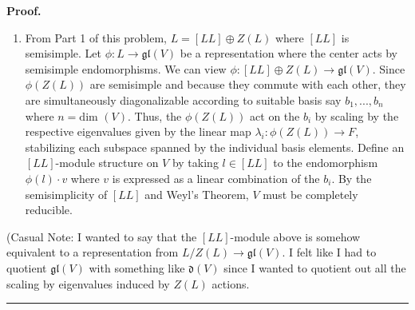 \documentclass[12pt]{article}%
\newenvironment{proof}[1][Proof]{\textbf{#1.} }{\ \rule{0.5em}{0.5em}}
\begin{document}
\begin{proof}
\begin{enumerate}
    \item From Part 1 of this problem, $L = [LL] \oplus Z(L)$ where $[LL]$ is semisimple. Let $\phi: L \rightarrow \mathfrak{gl}(V)$ be a representation where the center acts by semisimple endomorphisms. We can view $\phi: [LL] \oplus Z(L) \rightarrow \mathfrak{gl}(V)$. Since $\phi(Z(L))$ are semisimple and because they commute with each other, they are simultaneously diagonalizable according to suitable basis say $b_1,...,b_n$ where $n = \text{dim }(V)$. Thus, the $\phi(Z(L))$ act on the $b_i$ by scaling by the respective eigenvalues given by the linear map $\lambda_i:\phi(Z(L)) \rightarrow F$, stabilizing each subspace spanned by the individual basis elements. Define an $[LL]$-module structure on $V$ by taking $l \in [LL]$ to the endomorphism $\phi(l)\cdot v$ where $v$ is expressed as a linear combination of the $b_i$. By the semisimplicity of $[LL]$ and Weyl's Theorem, $V$ must be completely reducible.
   \end{enumerate}
   (Casual Note: I wanted to say that the $[LL]$-module above is somehow equivalent to a representation from $L/Z(L) \rightarrow \mathfrak{gl}(V)$. I felt like I had to quotient $\mathfrak{gl}(V)$ with something like $\mathfrak{d}(V)$ since I wanted to quotient out all the scaling by eigenvalues induced by $Z(L)$ actions.
 \end{proof}
\end{document}
